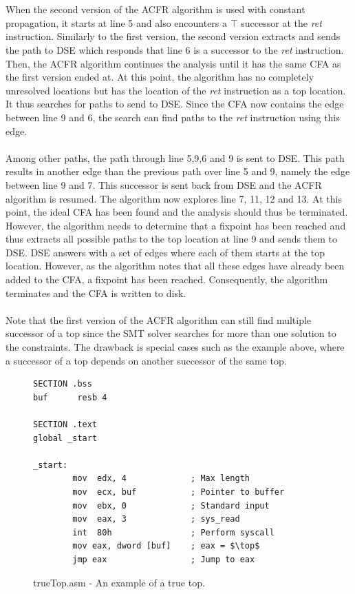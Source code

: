 \documentclass{kththesis}
\renewcommand{\it}[1]{\textit{#1}}
\begin{document}
\\ \\
When the second version of the ACFR algorithm is used with constant propagation, it starts at line 5 and also encounters a $\top$ successor at the \it{ret} instruction. Similarly to the first version, the second version extracts and sends the path to DSE which responds that line 6 is a successor to the \it{ret} instruction. Then, the ACFR algorithm continues the analysis until it has the same CFA as the first version ended at. At this point, the algorithm has no completely unresolved locations but has the location of the \it{ret} instruction as a top location. It thus searches for paths to send to DSE. Since the CFA now contains the edge between line 9 and 6, the search can find paths to the \it{ret} instruction using this edge.
\\ \\
Among other paths, the path through line 5,9,6 and 9 is sent to DSE. This path results in another edge than the previous path over line 5 and 9, namely the edge between line 9 and 7. This successor is sent back from DSE and the ACFR algorithm is resumed. The algorithm now explores line 7, 11, 12 and 13. At this point, the ideal CFA has been found and the analysis should thus be terminated. However, the algorithm needs to determine that a fixpoint has been reached and thus extracts all possible paths to the top location at line 9 and sends them to DSE. DSE answers with a set of edges where each of them starts at the top location. However, as the algorithm notes that all these edges have already been added to the CFA, a fixpoint has been reached. Consequently, the algorithm terminates and the CFA is written to disk. 
\\ \\
Note that the first version of the ACFR algorithm can still find multiple successor of a top since the SMT solver searches for more than one solution to the constraints. The drawback is special cases such as the example above, where a successor of a top depends on another successor of the same top.
\begin{figure}[ht]
    \centering
\begin{tcolorbox}
\begin{verbatim}
SECTION .bss
buf      resb 4

SECTION .text
global _start

_start:
        mov  edx, 4             ; Max length
        mov  ecx, buf           ; Pointer to buffer
        mov  ebx, 0             ; Standard input
        mov  eax, 3             ; sys_read
        int  80h                ; Perform syscall
        mov eax, dword [buf]    ; eax = $\top$
        jmp eax                 ; Jump to eax
\end{verbatim}
\end{tcolorbox}
\caption{trueTop.asm - An example of a true top.}
    \label{fig:trueTop.asm}
\end{figure}
\end{document}
